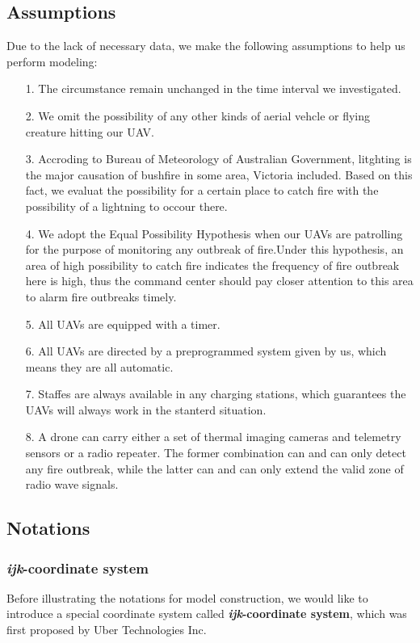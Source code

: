 \documentclass[13pt]{ctexart} %
\begin{document}
\subsection{Assumptions}
Due to the lack of necessary data, we make the following assumptions to help us perform modeling:

\begin{itemize}[itemsep=0.3ex, leftmargin=1.2cm]
    \item[1.] The circumstance remain unchanged in the time interval we investigated.
    \item[2.] We omit the possibility of any other kinds of aerial vehcle or flying creature hitting our UAV.
    \item[3.] Accroding to Bureau of Meteorology of Australian Government, litghting is the major causation of bushfire in some area, Victoria included. \cite{ref02} Based on this fact, we evaluat the possibility for a certain place to catch fire with the possibility of a lightning to occour there.
    \item[4.]  We adopt the Equal Possibility Hypothesis when our UAVs are patrolling for the purpose of monitoring any outbreak of fire.Under this hypothesis, an area of high possibility to catch fire indicates the frequency of fire outbreak here is high, thus the command center should pay closer attention to this area to alarm fire outbreaks timely.
    \item[5.] All UAVs are equipped with a timer.
    \item[6.] All UAVs are directed by a preprogrammed system given by us, which means they are all automatic.
    \item[7.] Staffes are always available in any charging stations, which guarantees the UAVs will always work in the stanterd situation.
    \item[8.] A drone can carry either a set of thermal imaging cameras and telemetry sensors or a radio repeater. The former combination can and can only detect any fire outbreak, while the latter can and can only extend the valid zone of radio wave signals.
\end{itemize}
\subsection{Notations}
\subsubsection{\textit{ijk}-coordinate system}
Before illustrating the notations for model construction, we would like to introduce a special coordinate system called \textbf{\textit{ijk}-coordinate system}\cite{uber-h3-doc}, which was first proposed by Uber Technologies Inc.
\end{document}
